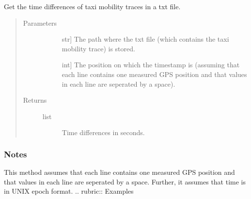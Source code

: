 \documentclass[letterpaper,10pt,english]{sphinxmanual}
\begin{document}
\begin{fulllineitems}
\label{\detokenize{index:gps2net.getTimeDifferences}}
Get the time differences of taxi mobility traces in a txt file.
\begin{quote}\begin{description}
\item[{Parameters}] \leavevmode\begin{description}
\item[{}] \leavevmode{[}str{]}
The path where the txt file (which contains the taxi mobility trace) is stored.

\item[{}] \leavevmode{[}int{]}
The position on which the timestamp is (assuming that each line contains one measured GPS position and that values in each line are seperated by a space).

\end{description}

\item[{Returns}] \leavevmode\begin{description}
\item[{list}] \leavevmode
Time differences in seconds.

\end{description}

\end{description}\end{quote}
\subsubsection*{Notes}

This method assumes that each line contains one measured GPS position and that values in each line are seperated by a space. Further, it assumes that time is in UNIX epoch format.
.. rubric:: Examples

\begin{sphinxVerbatim}[commandchars=\\\{\}]
  
   
\end{sphinxVerbatim}

\end{fulllineitems}
\end{document}
